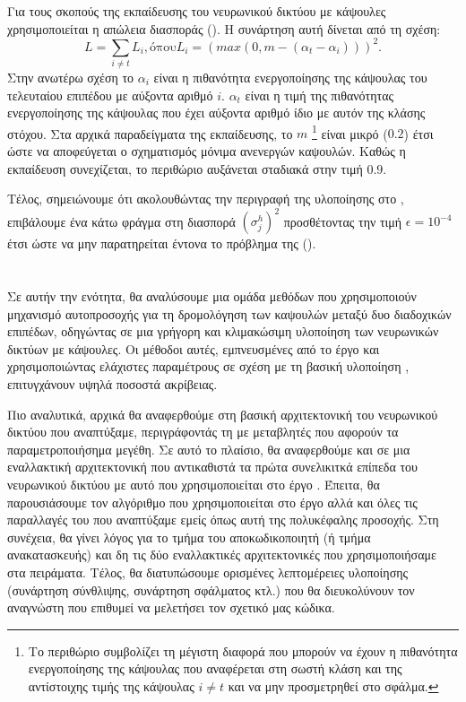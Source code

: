 Για τους σκοπούς της εκπαίδευσης του νευρωνικού δικτύου με κάψουλες χρησιμοποιείται η απώλεια διασποράς (). Η συνάρτηση αυτή δίνεται από τη σχέση:
\begin{equation}
  L = \sum_{i\neq t} L_i, \text{όπου} L_i = (max(0, m - (\alpha_t - \alpha_i)))^2.
\end{equation}
Στην ανωτέρω σχέση το $\alpha_i$ είναι η πιθανότητα ενεργοποίησης της κάψουλας του τελευταίου επιπέδου με αύξοντα αριθμό $i$. $\alpha_t$ είναι η τιμή της πιθανότητας ενεργοποίησης της κάψουλας που έχει αύξοντα αριθμό ίδιο με αυτόν της κλάσης στόχου. Στα αρχικά παραδείγματα της εκπαίδευσης, το  $m$ \footnote{Το περιθώριο συμβολίζει τη μέγιστη διαφορά που μπορούν να έχουν η πιθανότητα ενεργοποίησης της κάψουλας που αναφέρεται στη σωστή κλάση και της αντίστοιχης τιμής της κάψουλας $i \neq t$ και να μην προσμετρηθεί στο σφάλμα.} είναι μικρό ($0.2$) έτσι ώστε να αποφεύγεται ο σχηματισμός μόνιμα ανενεργών καψουλών. Καθώς η εκπαίδευση συνεχίζεται, το περιθώριο αυξάνεται σταδιακά στην τιμή $0.9$.\par

Τέλος, σημειώνουμε ότι ακολουθώντας την περιγραφή της υλοποίησης στο \cite{gritzman2019avoiding}, επιβάλουμε ένα κάτω φράγμα στη διασπορά $(\sigma_j^h)^2$ προσθέτοντας την τιμή $\epsilon = 10^{-4}$ έτσι ώστε να μην παρατηρείται έντονα το πρόβλημα της  ().


\section{}
\label{sec:method_3}

Σε αυτήν την ενότητα, θα αναλύσουμε μια ομάδα μεθόδων που χρησιμοποιούν μηχανισμό αυτο\textendash προσοχής για τη δρομολόγηση των καψουλών μεταξύ δυο διαδοχικών επιπέδων, οδηγώντας σε μια γρήγορη και κλιμακώσιμη υλοποίηση των νευρωνικών δικτύων με κάψουλες. Οι μέθοδοι αυτές, εμπνευσμένες από το έργο \cite{mazzia2021efficient} και χρησιμοποιώντας ελάχιστες παραμέτρους σε σχέση με τη βασική υλοποίηση \cite{sabour2017dynamic}, επιτυγχάνουν υψηλά ποσοστά ακρίβειας. \par

Πιο αναλυτικά, αρχικά θα αναφερθούμε στη βασική αρχιτεκτονική του νευρωνικού δικτύου που αναπτύξαμε, περιγράφοντάς τη με μεταβλητές που αφορούν τα παραμετροποιήσημα μεγέθη. Σε αυτό το πλαίσιο, θα αναφερθούμε και σε μια εναλλακτική αρχιτεκτονική που αντικαθιστά τα πρώτα συνελικιτκά επίπεδα του νευρωνικού δικτύου με αυτό που χρησιμοποιείται στο έργο \cite{sabour2017dynamic}. Έπειτα, θα παρουσιάσουμε τον αλγόριθμο που χρησιμοποιείται στο έργο \cite{mazzia2021efficient} αλλά και όλες τις παραλλαγές του που αναπτύξαμε εμείς όπως αυτή της πολυκέφαλης προσοχής. Στη συνέχεια, θα γίνει λόγος για το τμήμα του αποκωδικοποιητή (ή τμήμα ανακατασκευής) και δη τις δύο εναλλακτικές αρχιτεκτονικές που χρησιμοποιήσαμε στα πειράματα. Τέλος, θα διατυπώσουμε ορισμένες λεπτομέρειες υλοποίησης (συνάρτηση σύνθλιψης, συνάρτηση σφάλματος κτλ.) που θα διευκολύνουν τον αναγνώστη που επιθυμεί να μελετήσει τον σχετικό μας κώδικα.\par

